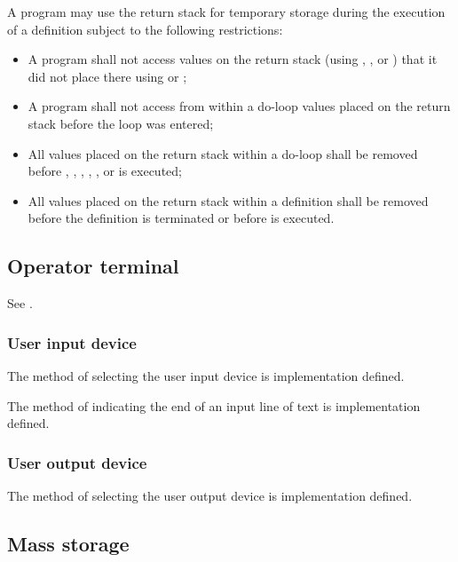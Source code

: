 A program may use the return stack for temporary storage during the
execution of a definition subject to the following restrictions:

\begin{itemize}
\item A program shall not access values on the return stack
	(using , ,  or )
	that it did not place there using  or ;

\item A program shall not access from within a do-loop values
	placed on the return stack before the loop was entered;

\item All values placed on the return stack within a do-loop
	shall be removed before , , ,
	, , or  is executed;

\item All values placed on the return stack within a definition
	shall be removed before the definition is terminated or
	before  is executed.
\end{itemize}

\subsection{Operator terminal} %

See .

\subsubsection{User input device} %
\label{usage:input}

The method of selecting the user input device is implementation
defined.

The method of indicating the end of an input line of text is
implementation defined.

\subsubsection{User output device} %
\label{usage:output}

The method of selecting the user output device is implementation
defined.

\subsection{Mass storage} %

